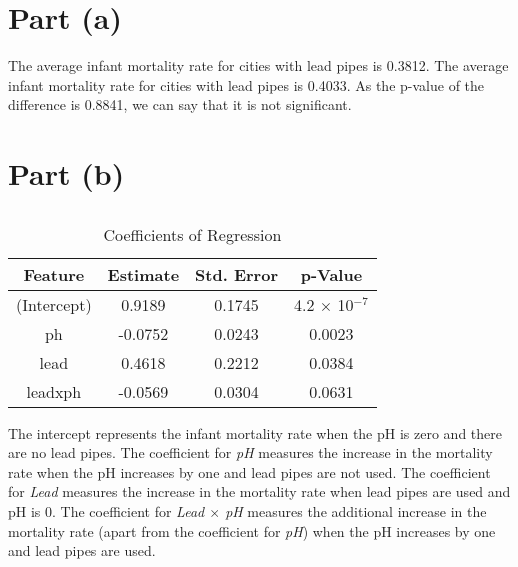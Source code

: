 \documentclass{./solution}
\begin{document}
    \begin{solution}
        \section{Part (a)}
            The average infant mortality rate for cities with lead pipes is 0.3812.
            The average infant mortality rate for cities with lead pipes is 0.4033.
            As the p-value of the difference is 0.8841, we can say that it is not significant.

        \section{Part (b)}
            \subsection{}
                \begin{table}[H]
                    \caption{Coefficients of Regression}
                    \begin{tabularx}{\textwidth}{C C C C}
                        \toprule
                        Feature & Estimate & Std. Error & p-Value \\
                        \midrule
                        (Intercept) &  0.9189 & 0.1745 & 4.2 $\times$ 10$^{-7}$ \\
                        ph          & -0.0752 & 0.0243 & 0.0023 \\
                        lead        &  0.4618 & 0.2212 & 0.0384 \\
                        leadxph     & -0.0569 & 0.0304 & 0.0631 \\
                        \bottomrule
                    \end{tabularx}
                \end{table}

                The intercept represents the infant mortality rate when the pH is zero and there are no lead pipes.
                The coefficient for \textit{pH} measures the increase in the mortality rate when the pH increases by one and lead pipes are not used.
                The coefficient for \textit{Lead} measures the increase in the mortality rate when lead pipes are used and pH is 0.
                The coefficient for \textit{Lead $\times$ pH} measures the additional increase in the mortality rate (apart from the coefficient for \textit{pH}) when the pH increases by one and lead pipes are used.


\end{solution}
\end{document}
